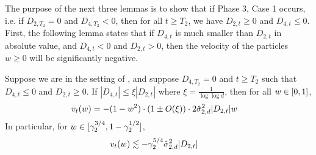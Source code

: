 
The purpose of the next three lemmas is to show that if Phase 3, Case 1 occurs, i.e. if $D_{2, T_2} = 0$ and $D_{4, T_2} < 0$, then for all $t \geq T_2$, we have $D_{2, t} \geq 0$ and $D_{4, t} \leq 0$. First, the following lemma states that if $D_{4, t}$ is much smaller than $D_{2, t}$ in absolute value, and $D_{4, t} < 0$ and $D_{2, t} > 0$, then the velocity of the particles $w \geq 0$ will be significantly negative.

\begin{lemma} \label{lemma:phase3_case1_d4small_velocity}
Suppose we are in the setting of , and suppose $D_{4, T_2} = 0$ and $t \geq T_2$ such that $D_{4, t} \leq 0$ and $D_{2, t} \geq 0$. If $|D_{4, t}| \leq \xi |D_{2, t}|$ where $\xi = \frac{1}{\log \log d}$, then for all $w \in [0, 1]$,
\begin{align}
v_t(w)
& = -(1 - w^2) \cdot (1 \pm O(\xi)) \cdot 2 \hat{\sigma}_{2, d}^2 |D_{2, t}| w
\end{align}
In particular, for $w \in [\gamma_2^{3/4}, 1 - \gamma_2^{1/2}]$,
\begin{align}
v_t(w)
& \lesssim - \gamma_2^{5/4} \hat{\sigma}_{2, d}^2 |D_{2, t}|
\end{align}
\end{lemma}
